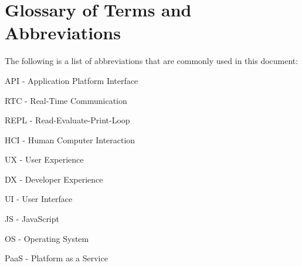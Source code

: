 \section{Glossary of Terms and Abbreviations}
The following is a list of abbreviations that are commonly used in this document:

API - Application Platform Interface

RTC - Real-Time Communication

REPL - Read-Evaluate-Print-Loop

HCI - Human Computer Interaction

UX - User Experience

DX - Developer Experience

UI - User Interface

JS - JavaScript

OS - Operating System

PaaS - Platform as a Service
\pagebreak
